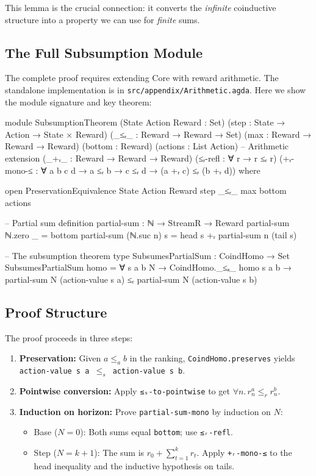 \documentclass[9pt,a4paper]{article}
\theoremstyle{plain}
\theoremstyle{definition}
\theoremstyle{remark}
\begin{document}
This lemma is the crucial connection: it converts the \emph{infinite} coinductive structure into a property we can use for \emph{finite} sums.

\subsection{The Full Subsumption Module}

The complete proof requires extending Core with reward arithmetic. The standalone implementation is in \texttt{src/appendix/Arithmetic.agda}. Here we show the module signature and key theorem:

\begin{code}
module SubsumptionTheorem
  (State Action Reward : Set)
  (step    : State → Action → State × Reward)
  (_≤ᵣ_    : Reward → Reward → Set)
  (max     : Reward → Reward → Reward)
  (bottom  : Reward)
  (actions : List Action)
  -- Arithmetic extension
  (_+ᵣ_      : Reward → Reward → Reward)
  (≤ᵣ-refl   : ∀ {r} → r ≤ᵣ r)
  (+ᵣ-mono-≤ : ∀ {a b c d} → a ≤ᵣ b → c ≤ᵣ d → (a +ᵣ c) ≤ᵣ (b +ᵣ d))
  where

  open PreservationEquivalence State Action Reward step _≤ᵣ_ max bottom actions

  -- Partial sum definition
  partial-sum : ℕ → StreamR → Reward
  partial-sum ℕ.zero    _ = bottom
  partial-sum (ℕ.suc n) s = head s +ᵣ partial-sum n (tail s)

  -- The subsumption theorem type
  SubsumesPartialSum : CoindHomo → Set
  SubsumesPartialSum homo = ∀ s a b N →
    CoindHomo._≤ₐ_ homo s a b →
    partial-sum N (action-value s a) ≤ᵣ partial-sum N (action-value s b)
\end{code}

\subsection{Proof Structure}

The proof proceeds in three steps:

\begin{enumerate}
\item \textbf{Preservation:} Given $a \le_a b$ in the ranking, \texttt{CoindHomo.preserves} yields \texttt{action-value s a $\le_s$ action-value s b}.

\item \textbf{Pointwise conversion:} Apply \texttt{≤ₛ-to-pointwise} to get $\forall n.\, r^a_n \le_r r^b_n$.

\item \textbf{Induction on horizon:} Prove \texttt{partial-sum-mono} by induction on $N$:
  \begin{itemize}
  \item Base ($N = 0$): Both sums equal \texttt{bottom}; use \texttt{≤ᵣ-refl}.
  \item Step ($N = k+1$): The sum is $r_0 + \sum_{t=1}^{k} r_t$. Apply \texttt{+ᵣ-mono-≤} to the head inequality and the inductive hypothesis on tails.
  \end{itemize}
\end{enumerate}
\end{document}
